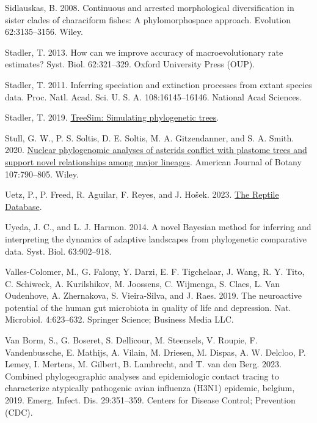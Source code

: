 \documentclass[fleqn,10pt,lineno]{wlpeerj} %
\newlength{\cslhangindent}
\newlength{\cslentryspacingunit} %
\newenvironment{CSLReferences}[2] %
 {%
  \setlength{\parindent}{0pt}
  \ifodd #1
  \let\oldpar\par
  \def\par{\hangindent=\cslhangindent\oldpar}
  \fi
  \setlength{\parskip}{#2\cslentryspacingunit}
 }%
 {}
\begin{document}
\begin{CSLReferences}{1}{0}
\leavevmode{}%
Sidlauskas, B. 2008. Continuous and arrested morphological diversification in sister clades of characiform fishes: A phylomorphospace approach. Evolution 62:3135--3156. Wiley.

\leavevmode{}%
Stadler, T. 2013. How can we improve accuracy of macroevolutionary rate estimates? Syst. Biol. 62:321--329. Oxford University Press (OUP).

\leavevmode{}%
Stadler, T. 2011. Inferring speciation and extinction processes from extant species data. Proc. Natl. Acad. Sci. U. S. A. 108:16145--16146. National Acad Sciences.

\leavevmode{}%
Stadler, T. 2019. \href{https://CRAN.R-project.org/package=TreeSim}{TreeSim: Simulating phylogenetic trees}.

\leavevmode{}%
Stull, G. W., P. S. Soltis, D. E. Soltis, M. A. Gitzendanner, and S. A. Smith. 2020. \href{https://doi.org/10.1002/ajb2.1468}{Nuclear phylogenomic analyses of asterids conflict with plastome trees and support novel relationships among major lineages}. American Journal of Botany 107:790--805. Wiley.

\leavevmode{}%
Uetz, P., P. Freed, R. Aguilar, F. Reyes, and J. Hošek. 2023. \href{http://www.reptile-database.org}{The {R}eptile {D}atabase}.

\leavevmode{}%
Uyeda, J. C., and L. J. Harmon. 2014. A novel {B}ayesian method for inferring and interpreting the dynamics of adaptive landscapes from phylogenetic comparative data. Syst. Biol. 63:902--918.

\leavevmode{}%
Valles-Colomer, M., G. Falony, Y. Darzi, E. F. Tigchelaar, J. Wang, R. Y. Tito, C. Schiweck, A. Kurilshikov, M. Joossens, C. Wijmenga, S. Claes, L. Van Oudenhove, A. Zhernakova, S. Vieira-Silva, and J. Raes. 2019. The neuroactive potential of the human gut microbiota in quality of life and depression. Nat. Microbiol. 4:623--632. Springer Science; Business Media LLC.

\leavevmode{}%
Van Borm, S., G. Boseret, S. Dellicour, M. Steensels, V. Roupie, F. Vandenbussche, E. Mathijs, A. Vilain, M. Driesen, M. Dispas, A. W. Delcloo, P. Lemey, I. Mertens, M. Gilbert, B. Lambrecht, and T. van den Berg. 2023. Combined phylogeographic analyses and epidemiologic contact tracing to characterize atypically pathogenic avian influenza ({H3N1}) epidemic, belgium, 2019. Emerg. Infect. Dis. 29:351--359. Centers for Disease Control; Prevention (CDC).


\end{CSLReferences}
\end{document}
